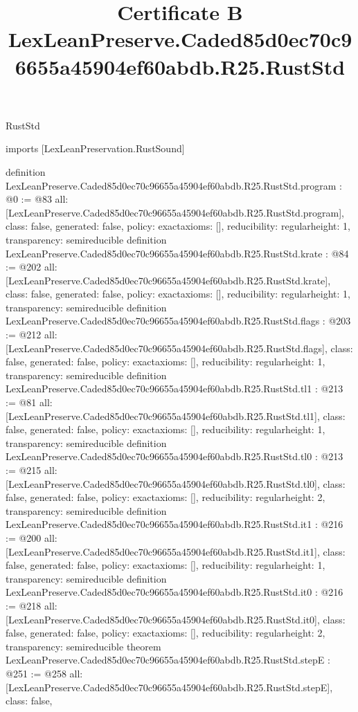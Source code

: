 \begin{lexlean}{RustStd}
\title{Certificate B LexLeanPreserve.Caded85d0ec70c96655a45904ef60abdb.R25.RustStd}
\begin{coremodule}
imports [LexLeanPreservation.RustSound]

definition LexLeanPreserve.Caded85d0ec70c96655a45904ef60abdb.R25.RustStd.program : @0 := @83 {
  all: [LexLeanPreserve.Caded85d0ec70c96655a45904ef60abdb.R25.RustStd.program],
  class: false,
  generated: false,
  policy: exact{axioms: []},
  reducibility: regular{height: 1},
  transparency: semireducible
}
definition LexLeanPreserve.Caded85d0ec70c96655a45904ef60abdb.R25.RustStd.krate : @84 := @202 {
  all: [LexLeanPreserve.Caded85d0ec70c96655a45904ef60abdb.R25.RustStd.krate],
  class: false,
  generated: false,
  policy: exact{axioms: []},
  reducibility: regular{height: 1},
  transparency: semireducible
}
definition LexLeanPreserve.Caded85d0ec70c96655a45904ef60abdb.R25.RustStd.flags : @203 := @212 {
  all: [LexLeanPreserve.Caded85d0ec70c96655a45904ef60abdb.R25.RustStd.flags],
  class: false,
  generated: false,
  policy: exact{axioms: []},
  reducibility: regular{height: 1},
  transparency: semireducible
}
definition LexLeanPreserve.Caded85d0ec70c96655a45904ef60abdb.R25.RustStd.tl1 : @213 := @81 {
  all: [LexLeanPreserve.Caded85d0ec70c96655a45904ef60abdb.R25.RustStd.tl1],
  class: false,
  generated: false,
  policy: exact{axioms: []},
  reducibility: regular{height: 1},
  transparency: semireducible
}
definition LexLeanPreserve.Caded85d0ec70c96655a45904ef60abdb.R25.RustStd.tl0 : @213 := @215 {
  all: [LexLeanPreserve.Caded85d0ec70c96655a45904ef60abdb.R25.RustStd.tl0],
  class: false,
  generated: false,
  policy: exact{axioms: []},
  reducibility: regular{height: 2},
  transparency: semireducible
}
definition LexLeanPreserve.Caded85d0ec70c96655a45904ef60abdb.R25.RustStd.it1 : @216 := @200 {
  all: [LexLeanPreserve.Caded85d0ec70c96655a45904ef60abdb.R25.RustStd.it1],
  class: false,
  generated: false,
  policy: exact{axioms: []},
  reducibility: regular{height: 1},
  transparency: semireducible
}
definition LexLeanPreserve.Caded85d0ec70c96655a45904ef60abdb.R25.RustStd.it0 : @216 := @218 {
  all: [LexLeanPreserve.Caded85d0ec70c96655a45904ef60abdb.R25.RustStd.it0],
  class: false,
  generated: false,
  policy: exact{axioms: []},
  reducibility: regular{height: 2},
  transparency: semireducible
}
theorem LexLeanPreserve.Caded85d0ec70c96655a45904ef60abdb.R25.RustStd.stepE : @251 := @258 {
  all: [LexLeanPreserve.Caded85d0ec70c96655a45904ef60abdb.R25.RustStd.stepE],
  class: false,
}
\end{coremodule}
\end{lexlean}
